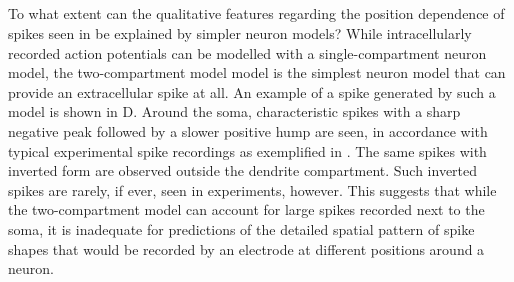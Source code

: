%
%



\subsection{}
\label{sec:Spikes:two-compartment}
To what extent can the qualitative features regarding the position dependence of spikes seen 
in  be explained by simpler neuron models? 
While intracellularly recorded action potentials can be modelled with a single-compartment neuron model, 
the two-compartment model model is the simplest neuron model that can provide an extracellular spike at all. 
An example of a spike generated by such a model is shown in D. Around the soma, characteristic spikes with a sharp negative peak followed by a slower positive hump are seen, in accordance with typical experimental spike recordings as exemplified in . The same spikes with inverted form are observed outside the dendrite compartment. Such inverted spikes are rarely, if ever, seen in experiments, however. This suggests that while the two-compartment model can account for large spikes recorded next to the soma, it is inadequate for 
predictions of  the detailed spatial pattern of spike shapes that would be recorded by an electrode at different positions around a neuron.   

